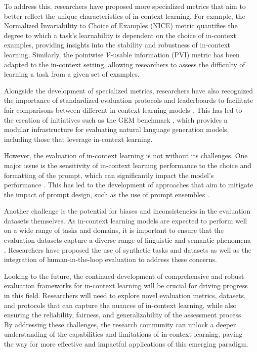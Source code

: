 \documentclass[11pt]{article}
\begin{document}
To address this, researchers have proposed more specialized metrics that aim to better reflect the unique characteristics of in-context learning. For example, the Normalized Invariability to Choice of Examples (NICE) metric \cite{ref45} quantifies the degree to which a task's learnability is dependent on the choice of in-context examples, providing insights into the stability and robustness of in-context learning. Similarly, the pointwise \(\mathcal{V}\)-usable information (PVI) metric \cite{ref46} has been adapted to the in-context setting, allowing researchers to assess the difficulty of learning a task from a given set of examples.

Alongside the development of specialized metrics, researchers have also recognized the importance of standardized evaluation protocols and leaderboards to facilitate fair comparisons between different in-context learning models \cite{ref47}. This has led to the creation of initiatives such as the GEM benchmark \cite{ref42}, which provides a modular infrastructure for evaluating natural language generation models, including those that leverage in-context learning.

However, the evaluation of in-context learning is not without its challenges. One major issue is the sensitivity of in-context learning performance to the choice and formatting of the prompt, which can significantly impact the model's performance \cite{ref48}. This has led to the development of approaches that aim to mitigate the impact of prompt design, such as the use of prompt ensembles \cite{ref48}.

Another challenge is the potential for biases and inconsistencies in the evaluation datasets themselves. As in-context learning models are expected to perform well on a wide range of tasks and domains, it is important to ensure that the evaluation datasets capture a diverse range of linguistic and semantic phenomena \cite{ref49}. Researchers have proposed the use of synthetic tasks and datasets \cite{ref49,ref50} as well as the integration of human-in-the-loop evaluation \cite{ref49} to address these concerns.

Looking to the future, the continued development of comprehensive and robust evaluation frameworks for in-context learning will be crucial for driving progress in this field. Researchers will need to explore novel evaluation metrics, datasets, and protocols that can capture the nuances of in-context learning, while also ensuring the reliability, fairness, and generalizability of the assessment process. By addressing these challenges, the research community can unlock a deeper understanding of the capabilities and limitations of in-context learning, paving the way for more effective and impactful applications of this emerging paradigm.
\end{document}
